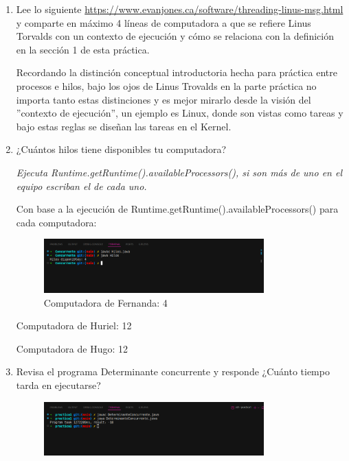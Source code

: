 \begin{enumerate}
    \item Lee lo siguiente \href{https://www.evanjones.ca/software/threading-linus-msg.html}{https://www.evanjones.ca/software/threading-linus-msg.html} y comparte en máximo 4 líneas de computadora a que se refiere Linus Torvalds con un contexto de ejecución y cómo se relaciona con la definición en la sección 1 de esta práctica.

    Recordando la distinción conceptual introductoria hecha para práctica entre procesos e hilos, bajo los ojos de Linus Trovalds en la parte práctica no importa tanto estas distinciones y es mejor mirarlo desde la visión del ''contexto de ejecución'', un ejemplo es Linux, donde son vistas como tareas y bajo estas reglas se diseñan las tareas en el Kernel.

    \hfill
    
    \item  ¿Cuántos hilos tiene disponibles tu computadora?
    
    \textit{Ejecuta Runtime.getRuntime().availableProcessors(), si son más de uno en el equipo escriban el de cada uno.}

    Con base a la ejecución de Runtime.getRuntime().availableProcessors() para cada computadora:

    \begin{figure}[h]
        \centering
        \includegraphics[width=0.8\textwidth]{resources/Ej2.png}
        \caption{Computadora de Fernanda: 4}
    \end{figure}
    
    Computadora de Huriel: 12

    Computadora de Hugo: 12

    \hfill
    
    \item Revisa el programa Determinante concurrente y responde ¿Cuánto tiempo tarda en ejecutarse?

    \begin{figure}[h]
        \centering
        \includegraphics[width=0.8\textwidth]{resources/Ej3.png}
    \end{figure}


\end{enumerate}

